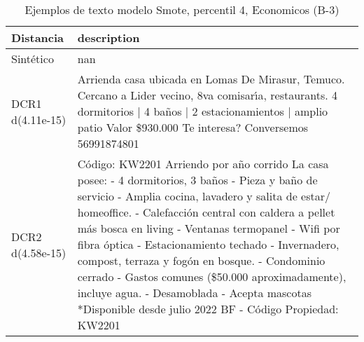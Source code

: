 \begin{table}[H]
\centering
\fontsize{10}{14}\selectfont
\caption{Ejemplos de texto modelo Smote, percentil 4, Economicos (B-3)}
\label{table-example-economicos-b-3-smote-enc-4p-text}
\begin{tabular}{|l|m{35em}|}
\hline
\rowcolor[gray]{0.8}
Distancia & description \\
\hline Sintético & nan \\
\hline DCR1 d(4.11e-15) & Arrienda casa ubicada en Lomas De Mirasur, Temuco. Cercano a Lider vecino, 8va comisar{\'\i}a, restaurants. 4 dormitorios | 4 ba\~nos | 2 estacionamientos | amplio patio Valor \$930.000   Te interesa? Conversemos 56991874801 \\
\hline DCR2 d(4.58e-15) & C\'odigo: KW2201 Arriendo por a\~no corrido  La casa posee: - 4 dormitorios, 3 ba\~nos - Pieza y ba\~no de servicio - Amplia cocina, lavadero y salita de estar/ homeoffice.  - Calefacci\'on central con caldera a pellet m\'as  bosca en living  - Ventanas termopanel  - Wifi por fibra \'optica  - Estacionamiento techado  - Invernadero, compost, terraza y fog\'on en bosque. - Condominio cerrado  -  Gastos comunes (\$50.000 aproximadamente), incluye agua.  - Desamoblada  - Acepta mascotas   *Disponible desde julio 2022  BF - C\'odigo Propiedad: KW2201 \\
\hline
\end{tabular}
\end{table}
